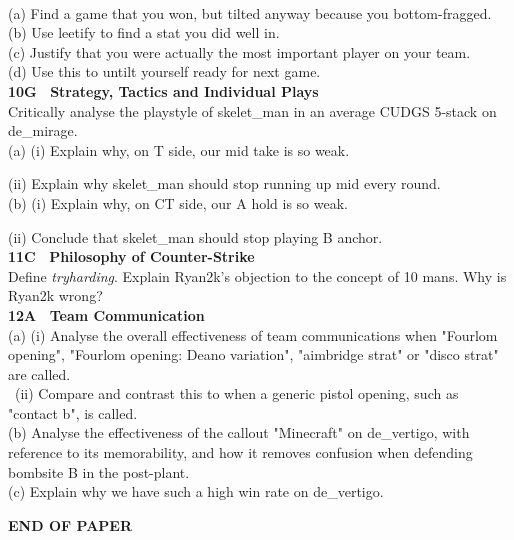 \documentclass{article}
\begin{document}
\vspace{5pt} \\ (a) Find a game that you won, but tilted anyway because you bottom-fragged. 
\vspace{5pt} \\ (b) Use leetify to find a stat you did well in. 
\vspace{5pt} \\ (c) Justify that you were actually the most important player on your team.
\vspace{5pt} \\ (d) Use this to untilt yourself ready for next game.
\vspace{15pt}\\ 
\textbf{10G \ Strategy, Tactics and Individual Plays}
\vspace{5pt} \\ Critically analyse the playstyle of skelet\_man in an average CUDGS 5-stack on de\_mirage.
\vspace{5pt}\\ (a) (i) Explain why, on T side, our mid take is so weak.
\par (ii) Explain why skelet\_man should stop running up mid every round.
\vspace{5pt}\\ (b) (i) Explain why, on CT side, our A hold is so weak.
\par (ii) Conclude that skelet\_man should stop playing B anchor.
\vspace{15pt} \\
\textbf{11C \ Philosophy of Counter-Strike}
\vspace{5pt} \\ Define \emph{tryharding}. Explain Ryan2k's objection to the concept of 10 mans. Why is Ryan2k wrong?
\vspace{15pt}\\ 
\textbf{12A \ Team Communication}
\vspace{5pt} \\ (a) (i) Analyse the overall effectiveness of team communications when "Fourlom opening", "Fourlom opening: Deano variation", "aimbridge strat" or "disco strat" are called.
\vspace{5pt} \\ \ (ii) Compare and contrast this to when a generic pistol opening, such as "contact b", is called.
\vspace{5pt} \\ (b) Analyse the effectiveness of the callout "Minecraft" on de\_vertigo, with reference to its memorability, and how it removes confusion when defending bombsite B in the post-plant.
\vspace{5pt} \\ (c) Explain why we have such a high win rate on de\_vertigo.
\vspace{5pt} \\
\begin{center}
    \large \textbf{END OF PAPER}
\end{center}
\end{document}
